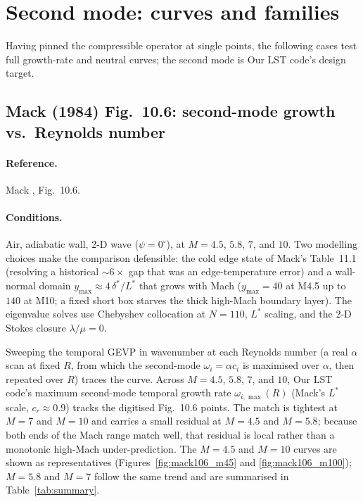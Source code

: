 \documentclass[11pt]{article}
\begin{document}
\section{Second mode: curves and families}
\label{sec:secondmode}
Having pinned the compressible operator at single points, the following cases test full
growth-rate and neutral curves; the second mode is Our LST code's design target.

\subsection{Mack (1984) Fig.~10.6: second-mode growth vs.\ Reynolds number}
\label{sec:mack106}

\paragraph{Reference.} Mack \cite{mack1984}, Fig.~10.6.

\paragraph{Conditions.} Air, adiabatic wall, 2-D wave ($\psi=0^\circ$), at $M=4.5$, $5.8$, $7$, and
$10$. Two modelling choices make the comparison defensible: the cold edge state of Mack's
Table~11.1 \cite{mack1984} (resolving a historical $\sim\!6\times$ gap that was an
edge-temperature error) and a
wall-normal domain $y_{\max}\approx4\,\delta^\ast/L^\ast$ that grows with Mach ($y_{\max}=40$ at
M4.5 up to $140$ at M10; a fixed short box starves the thick high-Mach boundary layer). The
eigenvalue solves use Chebyshev collocation at $N=110$, $L^\ast$ scaling, and the 2-D Stokes
closure $\lambda/\mu=0$.

Sweeping the temporal GEVP in wavenumber at each Reynolds number (a real $\alpha$ scan at fixed $R$,
from which the second-mode $\omega_i=\alpha c_i$ is maximised over $\alpha$, then repeated over $R$)
traces the curve. Across $M=4.5$, $5.8$, $7$, and $10$, Our LST code's maximum second-mode temporal
growth rate $\omega_{i,\max}(R)$ (Mack's $L^\ast$ scale, $c_r\approx0.9$) tracks the digitised
Fig.~10.6 points. The match is tightest at $M=7$ and $M=10$ and carries a small residual at $M=4.5$
and $M=5.8$; because both ends of the Mach range match well, that residual is local rather than a
monotonic high-Mach under-prediction. The $M=4.5$ and $M=10$ curves are shown as representatives
(Figures~\ref{fig:mack106_m45} and \ref{fig:mack106_m100}); $M=5.8$ and $M=7$ follow the same trend
and are summarised in Table~\ref{tab:summary}.
\end{document}
